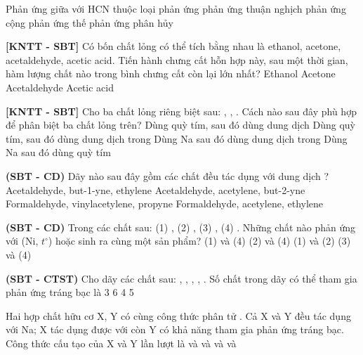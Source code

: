 \documentclass[12pt,a4paper]{article}
\begin{document}
\begin{ex}
Phản ứng giữa  với HCN thuộc loại phản ứng
\choice
{phản ứng thuận nghịch}
{phản ứng cộng}
{phản ứng thế}
{phản ứng phân hủy}
\end{ex}

\begin{ex}
\textbf{[KNTT - SBT]} Có bốn chất lỏng có thể tích bằng nhau là ethanol, acetone, acetaldehyde, acetic acid. Tiến hành chưng cất hỗn hợp này, sau một thời gian, hàm lượng chất nào trong bình chưng cất còn lại lớn nhất?
\choice
{Ethanol}
{Acetone}
{Acetaldehyde}
{Acetic acid}
\end{ex}

\begin{ex}
\textbf{[KNTT - SBT]} Cho ba chất lỏng riêng biệt sau: , , . Cách nào sau đây phù hợp để phân biệt ba chất lỏng trên?
\choice
{Dùng quỳ tím, sau đó dùng dung dịch }
{Dùng quỳ tím, sau đó dùng dung dịch  trong }
{Dùng Na sau đó dùng dung dịch  trong }
{Dùng Na sau đó dùng quỳ tím}
\end{ex}

\begin{ex}
\textbf{(SBT - CD)} Dãy nào sau đây gồm các chất đều tác dụng với dung dịch ?
\choice
{Acetaldehyde, but-1-yne, ethylene}
{Acetaldehyde, acetylene, but-2-yne}
{Formaldehyde, vinylacetylene, propyne}
{Formaldehyde, acetylene, ethylene}
\end{ex}

\begin{ex}
\textbf{(SBT - CD)} Trong các chất sau: (1) , (2) , (3) , (4) . Những chất nào phản ứng với  (Ni, $t^\circ$) hoặc  sinh ra cùng một sản phẩm?
\choice
{(1) và (4)}
{(2) và (4)}
{(1) và (2)}
{(3) và (4)}
\end{ex}

\begin{ex}
\textbf{(SBT - CTST)} Cho dãy các chất sau: , , , , . Số chất trong dãy có thể tham gia phản ứng tráng bạc là
\choice
{3}
{6}
{4}
{5}
\end{ex}

\begin{ex}
Hai hợp chất hữu cơ X, Y có cùng công thức phân tử . Cả X và Y đều tác dụng với Na; X tác dụng được với  còn Y có khả năng tham gia phản ứng tráng bạc. Công thức cấu tạo của X và Y lần lượt là
\choice
{ và }
{ và }
{ và }
{ và }
\end{ex}
\end{document}
